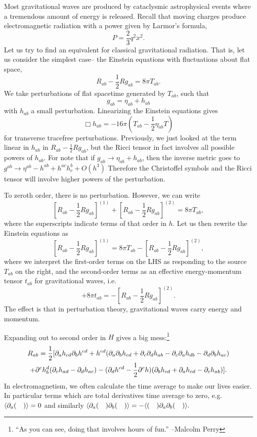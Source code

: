 Most gravitational waves are produced by cataclysmic astrophysical events where a tremendous amount of energy is released. Recall that moving charges produce electromagnetic radiation with a power given by Larmor's formula,
$$P=\frac{2}{3}q^2 \ddot x^2.$$
Let us try to find an equivalent for classical gravitational radiation. That is, let us consider the simplest case-- the Einstein equations with fluctuations about flat space,
$$R_{ab}-\frac{1}{2}Rg_{ab}=8\pi T_{ab}.$$
We take perturbations of flat spacetime generated by $T_{ab}$, such that
$$g_{ab}=\eta_{ab}+h_{ab}$$ with $h_{ab}$ a small perturbation. Linearizing the Einstein equations gives
$$\Box h_{ab}=-16\pi(T_{ab}-\frac{1}{2}\eta_{ab} T)$$
for transverse tracefree perturbations. Previously, we just looked at the term linear in $h_{ab}$ in $R_{ab}-\frac{1}{2}Rg_{ab}$, but the Ricci tensor in fact involves all possible powers of $h_{ab}$. For note that if $g_{ab}\to \eta_{ab}+h_{ab}$, then the inverse metric goes to $g^{ab}\to \eta^{ab}-h^{ab}+h^{ac}h^b_c +O(h^3)$ Therefore the Christoffel symbols and the Ricci tensor will involve higher powers of the perturbation.

To zeroth order, there is no perturbation. However, we can write
$$[R_{ab}-\frac{1}{2}Rg_{ab}]^{(1)}+[R_{ab}-\frac{1}{2}Rg_{ab}]^{(2)}=8\pi T_{ab},$$
where the superscripts indicate terms of that order in $h$. Let us then rewrite the Einstein equations as
$$[R_{ab}-\frac{1}{2}Rg_{ab}]^{(1)}=8\pi T_{ab}-[R_{ab}-\frac{1}{2}Rg_{ab}]^{(2)},$$
where we interpret the first-order terms on the LHS as responding to the source $T_{ab}$ on the right, and the second-order terms as an effective energy-momentum tensor $t_{ab}$ for gravitational waves, i.e.
$$+8\pi t_{ab}=-[R_{ab}-\frac{1}{2}R g_{ab}]^{(2)}.$$
The effect is that in perturbation theory, gravitational waves carry energy and momentum.

Expanding out to second order in $H$ gives a big mess:\footnote{``As you can see, doing that involves hours of fun.'' --Malcolm Perry}
\begin{multline*}
    R_{ab}=\frac{1}{2}[\partial_a h_{cd} \partial_b h^{cd}+h^{cd}(\partial_a \partial_b h_{cd}+\partial_c \partial_d h_{ab}-\partial_c \partial_a h_{db}-\partial_d \partial_b h_{ac})\\
    +\partial^c h^d_b(\partial_c h_{ad}-\partial_dh_{ac})-(\partial_d h^{cd}-\frac{1}{2}\partial^c h)(\partial_b h_{cd}+\partial_a h_{cd}-\partial_c h_{ab})].
\end{multline*}
In electromagnetism, we often calculate the time average to make our lives easier. In particular terms which are total derivatives time average to zero, e.g. $\langle\partial_a(\quad)\rangle=0$ and similarly $\langle\partial_a(\quad)\partial_b(\quad)\rangle=-\langle(\quad)\partial_a\partial_b(\quad)\rangle.$

